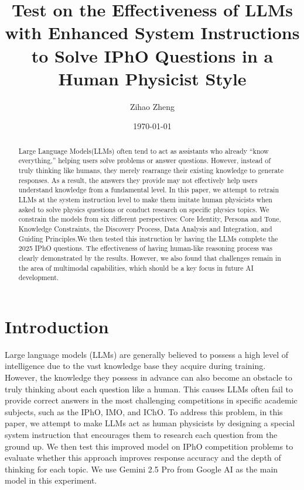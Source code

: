 \documentclass[12pt]{article}
\title{\textbf{Test on the Effectiveness of LLMs with Enhanced System Instructions to Solve IPhO Questions in a Human Physicist Style}}
\author{Zihao Zheng}
\date{\today}
\begin{document}
\maketitle

\begin{abstract}
Large Language Models(LLMs) often tend to act as assistants who already “know everything,” helping users solve problems or answer questions. However, instead of truly thinking like humans, they merely rearrange their existing knowledge to generate responses. As a result, the answers they provide may not effectively help users understand knowledge from a fundamental level. In this paper, we attempt to retrain LLMs at the system instruction level to make them imitate human physicists when asked to solve physics questions or conduct research on specific physics topics. We constrain the models from six different perspectives: Core Identity, Persona and Tone, Knowledge Constraints, the Discovery Process, Data Analysis and Integration, and Guiding Principles.We then tested this instruction by having the LLMs complete the 2025 IPhO questions. The effectiveness of having human-like reasoning process was clearly demonstrated by the results. However, we also found that challenges remain in the area of multimodal capabilities, which should be a key focus in future AI development.
\end{abstract}

\section{Introduction}

Large language models (LLMs) are generally believed to possess a high level of intelligence due to the vast knowledge base they acquire during training. However, the knowledge they possess in advance can also become an obstacle to truly thinking about each question like a human. This causes LLMs often fail to provide correct answers in the most challenging competitions in specific academic subjects, such as the IPhO, IMO, and IChO. To address this problem, in this paper, we attempt to make LLMs act as human physicists by designing a special system instruction that encourages them to research each question from the ground up. We then test this improved model on IPhO competition problems to evaluate whether this approach improves response accuracy and the depth of thinking for each topic. We use Gemini 2.5 Pro from Google AI as the main model in this experiment.
\end{document}
